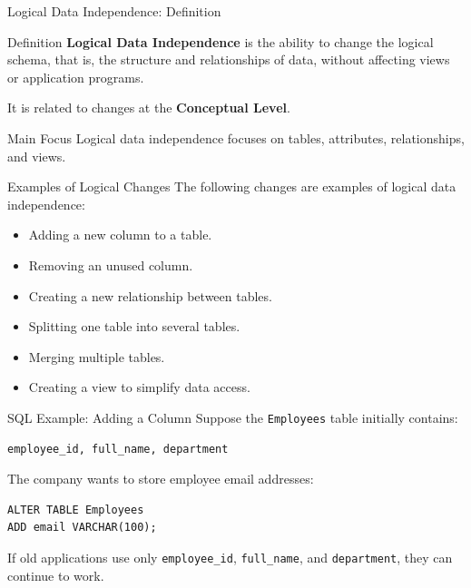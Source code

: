 \documentclass[aspectratio=169,11pt]{beamer}
\begin{document}
\begin{frame}{Logical Data Independence: Definition}
\begin{block}{Definition}
\textbf{Logical Data Independence} is the ability to change the logical schema, that is, the structure and relationships of data, without affecting views or application programs.
\end{block}

\vspace{0.3cm}
It is related to changes at the \textbf{Conceptual Level}.

\vspace{0.3cm}
\begin{alertblock}{Main Focus}
Logical data independence focuses on tables, attributes, relationships, and views.
\end{alertblock}
\end{frame}

\begin{frame}{Examples of Logical Changes}
The following changes are examples of logical data independence:
\begin{itemize}
  \item Adding a new column to a table.
  \item Removing an unused column.
  \item Creating a new relationship between tables.
  \item Splitting one table into several tables.
  \item Merging multiple tables.
  \item Creating a view to simplify data access.
\end{itemize}
\end{frame}

\begin{frame}[fragile]{SQL Example: Adding a Column}
Suppose the \texttt{Employees} table initially contains:

\begin{lstlisting}[style=sqlstyle]
employee_id, full_name, department
\end{lstlisting}

The company wants to store employee email addresses:

\begin{lstlisting}[style=sqlstyle]
ALTER TABLE Employees
ADD email VARCHAR(100);
\end{lstlisting}

If old applications use only \texttt{employee\_id}, \texttt{full\_name}, and \texttt{department}, they can continue to work.
\end{frame}
\end{document}
